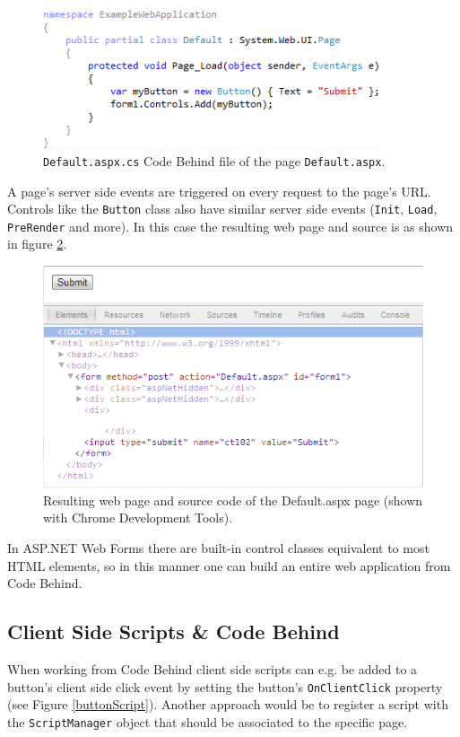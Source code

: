 				\begin{figure}[H]
					\includegraphics[width=10cm]{resources/images/CodeBehind.png}
				\caption{\texttt{Default.aspx.cs} Code Behind file of the page \texttt{Default.aspx}.}
				\label{codeBehind}
			\end{figure}
		
		A page's server side events are triggered on every request to the page's URL. Controls like the \texttt{Button} class also have similar server side events (\texttt{Init}, \texttt{Load}, \texttt{PreRender} and more). In this case the resulting web page and source is as shown in figure \ref{html}.

				\begin{figure}[H]
					\includegraphics[width=12cm]{resources/images/Html.png}
				\caption{Resulting web page and source code of the Default.aspx page (shown with Chrome Development Tools).}
				\label{html}
			\end{figure}

		In ASP.NET Web Forms there are built-in control classes equivalent to most HTML elements, so in this manner one can build an entire web application from Code Behind.

		\subsection{Client Side Scripts \& Code Behind} %
		\label{sub:client_side_scripts_code_behind}
			When working from Code Behind client side scripts can e.g. be added to a button's client side click event by setting the button's \texttt{OnClientClick} property (see Figure \ref{buttonScript}). Another approach would be to register a script with the \texttt{ScriptManager} object that should be associated to the specific page.

